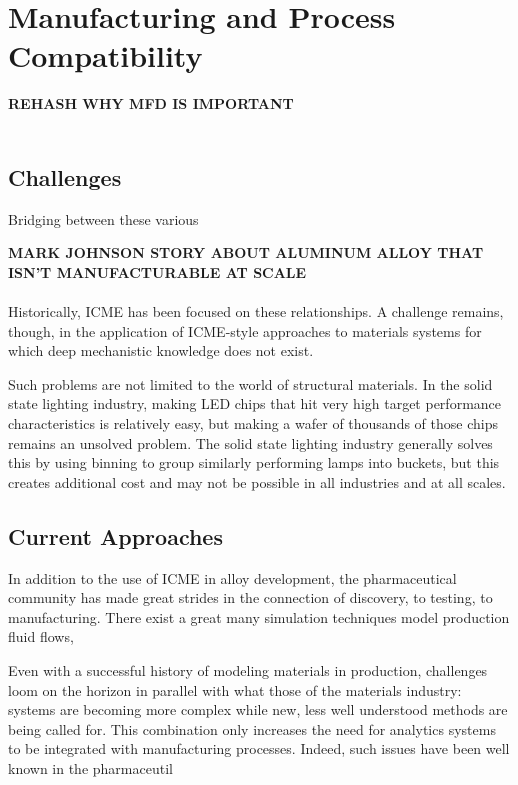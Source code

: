 

\section{Manufacturing and Process Compatibility}

\textbf{REHASH WHY MFD IS IMPORTANT}\\
\\

\subsection{Challenges}
Bridging between these various 

\textbf{MARK JOHNSON STORY ABOUT ALUMINUM ALLOY THAT ISN'T MANUFACTURABLE AT SCALE}\\
\\
Historically, ICME has been focused on these relationships. A challenge remains, though, in the application of ICME-style approaches to materials systems for which deep mechanistic knowledge does not exist. 

Such problems are not limited to the world of structural materials. In the solid state lighting industry, making LED chips that hit very high target performance characteristics is relatively easy, but making a wafer of thousands of those chips remains an unsolved problem. The solid state lighting industry generally solves this by using binning to group similarly performing lamps into buckets, but this creates additional cost and may not be possible in all industries and at all scales. 

\subsection{Current Approaches}
In addition to the use of ICME in alloy development, the pharmaceutical community has made great strides in the connection of discovery, to testing, to manufacturing. There exist a great many simulation techniques model production fluid flows,

Even with a successful history of modeling materials in production, challenges loom on the horizon in parallel with what those of the materials industry: systems are becoming more complex while new, less well understood methods are being called for. This combination only increases the need for analytics systems to be integrated with manufacturing processes.\cite{JPS:JPS24594} Indeed, such issues have been well known in the pharmaceutil


